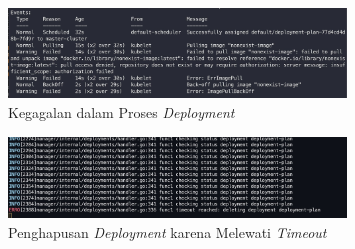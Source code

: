 \begin{figure}[ht]
  \centering
  \includegraphics[width=0.8\textwidth]{resources/chapter-4/pengujian/pengujian-sistem-gagal-08.jpg}
  \caption{Kegagalan dalam Proses \textit{Deployment}}
  \label{fig:pengujian-sistem-gagal-08}
\end{figure}

\begin{figure}[ht]
  \centering
  \includegraphics[width=0.8\textwidth]{resources/chapter-4/pengujian/pengujian-sistem-gagal-09.jpg}
  \caption{Penghapusan \textit{Deployment} karena Melewati \textit{Timeout}}
  \label{fig:pengujian-sistem-gagal-09}
\end{figure}
